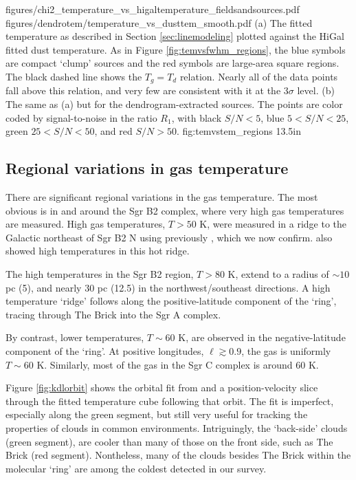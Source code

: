 \FigureTwo
{figures/chi2_temperature_vs_higaltemperature_fieldsandsources.pdf} %
{figures/dendrotem/temperature_vs_dusttem_smooth.pdf} %
{(a) The fitted temperature as described in Section \ref{sec:linemodeling} plotted
against the HiGal fitted dust temperature.  As in Figure \ref{fig:temvsfwhm_regions},
the blue symbols are compact `clump' sources and the red symbols are large-area
square regions.  The black dashed line shows the $T_g = T_d$ relation.  Nearly
all of the data points fall above this relation, and very few are consistent
with it at the 3$\sigma$ level.
(b) The same as (a) but for the dendrogram-extracted sources.
The points are color coded by signal-to-noise in the
ratio $R_1$, with black $S/N < 5$, blue $5 < S/N < 25$, green $25 < S/N < 50$,
and red $S/N > 50$.  }
{fig:temvstem_regions}
{1}{3.5in}

\subsection{Regional variations in gas temperature}
There are significant regional variations in the gas temperature.  The most
obvious is in and around the Sgr B2 complex, where very high gas temperatures
are measured.  High gas temperatures, $T>50$ K, were measured in a ridge to the
Galactic northeast of Sgr B2 N using \methylcyanide previously \citep[][Figure
4b]{de-Vicente1997a}, which we now confirm.  \citet{Ott2014a} also showed high
\ammonia temperatures in this hot ridge.

The high temperatures in the Sgr B2 region, $T>80$ K, extend to a radius of
$\sim10$ pc (5\arcmin), and nearly 30 pc (12.5\arcmin) in the
northwest/southeast directions.  A high temperature `ridge' follows along the
positive-latitude component of the \citet{Molinari2011a} `ring', tracing
through The Brick into the Sgr A complex.

By contrast, lower temperatures, $T\sim60$ K, are observed in the
negative-latitude component of the `ring'.  At positive longitudes,
$\ell\gtrsim0.9$, the gas is uniformly $T\sim60$ K.  Similarly, most of the gas
in the Sgr C complex is around 60 K.

Figure \ref{fig:kdlorbit} shows the orbital fit from \citet{Kruijssen2014d} and
a position-velocity slice through the fitted temperature cube following that
orbit.  The fit is imperfect, especially along the green segment, but still very useful
for tracking the properties of clouds in common environments.
Intriguingly, the `back-side' clouds (green segment), are cooler than
many of those on the front side, such as The Brick (red segment).  Nontheless,
many of the clouds besides The Brick within the molecular `ring' are among the
coldest detected in our survey.

